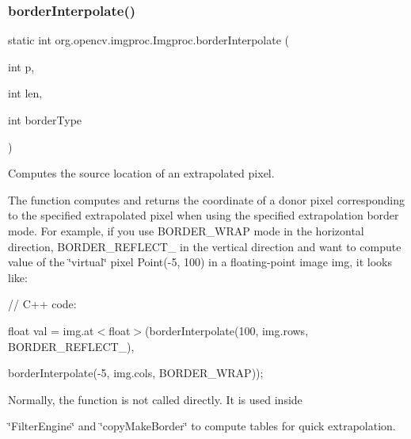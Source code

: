 \subsubsection{\texorpdfstring{border\+Interpolate()}{borderInterpolate()}}
{\footnotesize\ttfamily static int org.\+opencv.\+imgproc.\+Imgproc.\+border\+Interpolate (\begin{DoxyParamCaption}\item[{int}]{p,  }\item[{int}]{len,  }\item[{int}]{border\+Type }\end{DoxyParamCaption})\hspace{0.3cm}{\ttfamily [static]}}

Computes the source location of an extrapolated pixel.

The function computes and returns the coordinate of a donor pixel corresponding to the specified extrapolated pixel when using the specified extrapolation border mode. For example, if you use {\ttfamily B\+O\+R\+D\+E\+R\+\_\+\+W\+R\+AP} mode in the horizontal direction, {\ttfamily B\+O\+R\+D\+E\+R\+\_\+\+R\+E\+F\+L\+E\+C\+T\+\_} in the vertical direction and want to compute value of the \char`\"{}virtual\char`\"{} pixel {\ttfamily Point(-\/5, 100)} in a floating-\/point image {\ttfamily img}, it looks like\+: {\ttfamily }

{\ttfamily }

{\ttfamily }

{\ttfamily // C++ code\+:}

{\ttfamily }

{\ttfamily }

{\ttfamily float val = img.\+at$<$float$>$(border\+Interpolate(100, img.\+rows, B\+O\+R\+D\+E\+R\+\_\+\+R\+E\+F\+L\+E\+C\+T\+\_),}

{\ttfamily }

{\ttfamily }

{\ttfamily border\+Interpolate(-\/5, img.\+cols, B\+O\+R\+D\+E\+R\+\_\+\+W\+R\+AP));}

{\ttfamily }

{\ttfamily }

{\ttfamily Normally, the function is not called directly. It is used inside }

\char`\"{}\+Filter\+Engine\char`\"{} and \char`\"{}copy\+Make\+Border\char`\"{} to compute tables for quick extrapolation.


